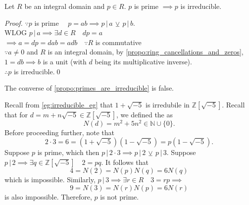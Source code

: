 \begin{propo}
\label{propo:primes_are_irreducible}
  Let $R$ be an integral domain and $p \in R$. $p$ is prime $\implies p$ is irreducible.
\end{propo}

\begin{proof}
  $\because p$ is prime $\quad p = ab \implies p \, | \, a \, \veebar \, p \, | \, b$. \\
  WLOG $p \, | \, a \implies \exists d \in R \quad dp = a$\\
  $\implies a = dp = dab = adb \quad \because R$ is commutative \\
  $\because a \neq 0$ and $R$ is an integral domain, by \cref{propo:ring_cancellations_and_zeros}, $1 = db \implies b$ is a unit (with $d$ being its multiplicative inverse). \\
  $\therefore p$ is irreducible.\qed
\end{proof}

The converse of \cref{propo:primes_are_irreducible} is false.

\begin{eg}
  Recall from \cref{eg:irreducible_eg} that $1 + \sqrt{-5}$ is irredubile in $\mathbb{Z}[\sqrt{-5}]$. Recall that for $d = m + n \sqrt{-5} \in \mathbb{Z}[\sqrt{-5}]$, we defined the  as
  \begin{equation*}
    N(d) = m^2 + 5n^2 \in \mathbb{N} \cup \{0\}.
  \end{equation*}
  Before proceeding further, note that
  \begin{equation*}
    2 \cdot 3 = 6 = (1 + \sqrt{-5})(1 - \sqrt{-5}) = p ( 1 - \sqrt{-5} ).
  \end{equation*}
  Suppose $p$ is prime, which then $p \, | \, 2 \cdot 3 \implies p \, | \, 2 \, \veebar \, p \, | \, 3$. Suppose $p \, | \, 2 \implies \exists q \in \mathbb{Z}[\sqrt{-5}] \quad 2 = pq$. It follows that
  \begin{equation*}
    4 = N(2) = N(p)N(q) = 6 N(q)
  \end{equation*}
  which is impossible. Similarly, $p \, | \, 3 \implies \exists r \in R \quad 3 = rp \implies$
  \begin{equation*}
    9 = N(3) = N(r)N(p) = 6N(r)
  \end{equation*}
  is also impossible. Therefore, $p$ is not prime.
\end{eg}


